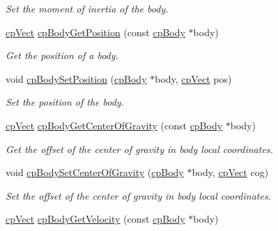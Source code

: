 \begin{DoxyCompactItemize}
\begin{DoxyCompactList}\small\item\em Set the moment of inertia of the body. \end{DoxyCompactList}\item 
\hypertarget{group__cp_body_ga4dfb0763294b03d4feb43c047593ab82}{}\hyperlink{structcp_vect}{cp\+Vect} \hyperlink{group__cp_body_ga4dfb0763294b03d4feb43c047593ab82}{cp\+Body\+Get\+Position} (const \hyperlink{structcp_body}{cp\+Body} $\ast$body)\label{group__cp_body_ga4dfb0763294b03d4feb43c047593ab82}

\begin{DoxyCompactList}\small\item\em Get the position of a body. \end{DoxyCompactList}\item 
\hypertarget{group__cp_body_gab01fd7156e534b10e1d8fe6e3b1e2424}{}void \hyperlink{group__cp_body_gab01fd7156e534b10e1d8fe6e3b1e2424}{cp\+Body\+Set\+Position} (\hyperlink{structcp_body}{cp\+Body} $\ast$body, \hyperlink{structcp_vect}{cp\+Vect} pos)\label{group__cp_body_gab01fd7156e534b10e1d8fe6e3b1e2424}

\begin{DoxyCompactList}\small\item\em Set the position of the body. \end{DoxyCompactList}\item 
\hypertarget{group__cp_body_ga58f6339888002b440b2ab2ce37bb2356}{}\hyperlink{structcp_vect}{cp\+Vect} \hyperlink{group__cp_body_ga58f6339888002b440b2ab2ce37bb2356}{cp\+Body\+Get\+Center\+Of\+Gravity} (const \hyperlink{structcp_body}{cp\+Body} $\ast$body)\label{group__cp_body_ga58f6339888002b440b2ab2ce37bb2356}

\begin{DoxyCompactList}\small\item\em Get the offset of the center of gravity in body local coordinates. \end{DoxyCompactList}\item 
\hypertarget{group__cp_body_gabd4342f2a705f59d398bfb2aed038e8c}{}void \hyperlink{group__cp_body_gabd4342f2a705f59d398bfb2aed038e8c}{cp\+Body\+Set\+Center\+Of\+Gravity} (\hyperlink{structcp_body}{cp\+Body} $\ast$body, \hyperlink{structcp_vect}{cp\+Vect} cog)\label{group__cp_body_gabd4342f2a705f59d398bfb2aed038e8c}

\begin{DoxyCompactList}\small\item\em Set the offset of the center of gravity in body local coordinates. \end{DoxyCompactList}\item 
\hypertarget{group__cp_body_ga535265ddfe9b24271152ca103c387883}{}\hyperlink{structcp_vect}{cp\+Vect} \hyperlink{group__cp_body_ga535265ddfe9b24271152ca103c387883}{cp\+Body\+Get\+Velocity} (const \hyperlink{structcp_body}{cp\+Body} $\ast$body)\label{group__cp_body_ga535265ddfe9b24271152ca103c387883}


\end{DoxyCompactItemize}
